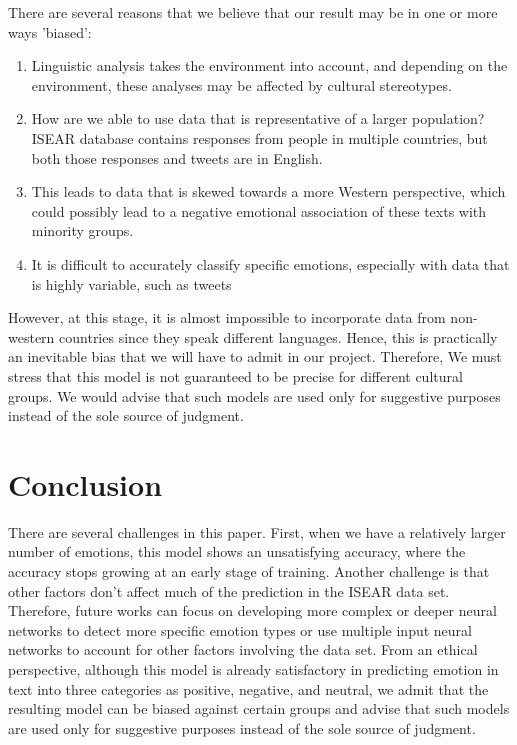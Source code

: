 \documentclass[11pt,a4paper,man,floatsintext]{apa6}
\begin{document}
There are several reasons that we believe that our result may be in one or more ways 'biased':
\begin{enumerate}
    \item Linguistic analysis takes the environment into account, and depending on the environment, these analyses may be affected by cultural stereotypes.
    \item How are we able to use data that is representative of a larger population? ISEAR database contains responses from people in multiple countries, but both those responses and tweets are in English.
    \item This leads to data that is skewed towards a more Western perspective, which could possibly lead to a negative emotional association of these texts with minority groups.
    \item It is difficult to accurately classify specific emotions, especially with data that is highly variable, such as tweets
\end{enumerate}
However, at this stage, it is almost impossible to incorporate data from non-western countries since they speak different languages. Hence, this is practically an inevitable bias that we will have to admit in our project. Therefore, We must stress that this model is not guaranteed to be precise for different cultural groups. We would advise that such models are used only for suggestive purposes instead of the sole source of judgment.

\section{Conclusion}

There are several challenges in this paper. First, when we have a relatively larger number of emotions, this model shows an unsatisfying accuracy, where the accuracy stops growing at an early stage of training. Another challenge is that other factors don’t affect much of the prediction in the ISEAR data set. Therefore, future works can focus on developing more complex or deeper neural networks to detect more specific emotion types or use multiple input neural networks to account for other factors involving the data set. From an ethical perspective, although this model is already satisfactory in predicting emotion in text into three categories as positive, negative, and neutral, we admit that the resulting model can be biased against certain groups and advise that such models are used only for suggestive purposes instead of the sole source of judgment. 

\printbibliography
\end{document}
